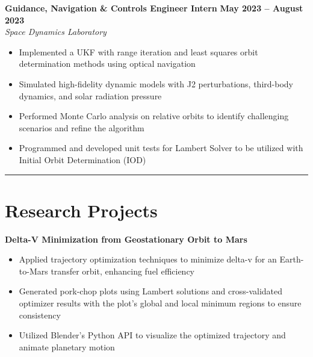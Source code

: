 \documentclass[10pt]{article}
\newcommand{\sectionline}{\noindent\rule{\linewidth}{0.4pt}}
\begin{document}
	\textbf{Guidance, Navigation \& Controls Engineer Intern} \hfill \textbf{May 2023 – August 2023} \\
	\emph{Space Dynamics Laboratory}
	\begin{itemize}
		\item Implemented a UKF with range iteration and least squares orbit determination methods using optical navigation
		\item Simulated high-fidelity dynamic models with J2 perturbations, third-body dynamics, and solar radiation pressure
		\item Performed Monte Carlo analysis on relative orbits to identify challenging scenarios and refine the algorithm
		\item Programmed and developed unit tests for Lambert Solver to be utilized with Initial Orbit Determination (IOD)
	\end{itemize}
	
	\sectionline
	
	\section*{Research Projects}
	
	\textbf{Delta-V Minimization from Geostationary Orbit to Mars}
	\begin{itemize}
		\item Applied trajectory optimization techniques to minimize delta-v for an Earth-to-Mars transfer orbit, enhancing fuel efficiency
		\item Generated pork-chop plots using Lambert solutions and cross-validated optimizer results with the plot’s global and local minimum regions to ensure consistency
		\item Utilized Blender’s Python API to visualize the optimized trajectory and animate planetary motion
	\end{itemize}
	
\end{document}
